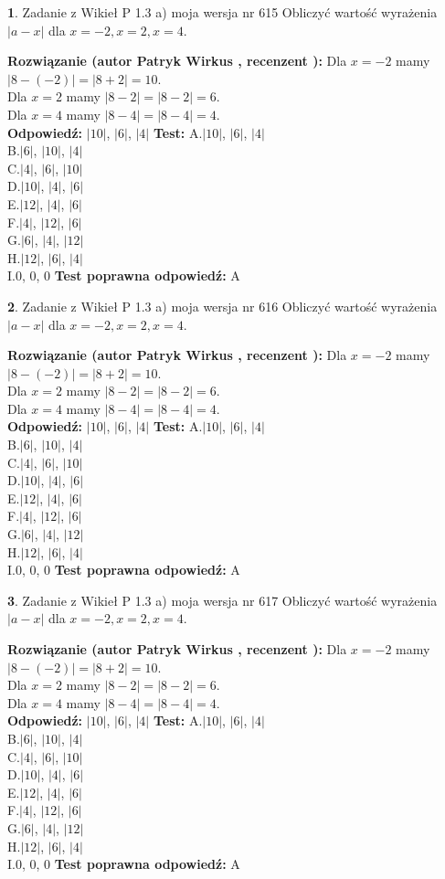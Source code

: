 \documentclass[12pt, a4paper]{article}
\theoremstyle{definition} %
\newtheorem{zad}{}
\newcommand{\zadStart}[1]{\begin{zad}#1\newline}
\newcommand{\zadStop}{\end{zad}}
\newcommand{\rozwStart}[2]{\noindent \textbf{Rozwiązanie (autor #1 , recenzent #2): }\newline}
\newcommand{\rozwStop}{\newline}
\newcommand{\odpStart}{\noindent \textbf{Odpowiedź:}\newline}
\newcommand{\odpStop}{\newline}
\newcommand{\testStart}{\noindent \textbf{Test:}\newline}
\newcommand{\testStop}{\newline}
\newcommand{\kluczStart}{\noindent \textbf{Test poprawna odpowiedź:}\newline}
\newcommand{\kluczStop}{\newline}
\begin{document}
\zadStart{Zadanie z Wikieł P 1.3 a) moja wersja nr 615}
Obliczyć wartość wyrażenia $|a - x|$ dla $x=-2,x=2,x=4$.
\zadStop
\rozwStart{Patryk Wirkus}{}
Dla $x = -2$ mamy $|8 - (-2)| = |8 + 2| = 10$.\\
Dla $x = 2$ mamy $|8 - 2| = |8 - 2| = 6$.\\
Dla $x = 4$ mamy $|8 - 4| = |8 - 4| = 4$.\\
\rozwStop
\odpStart
$|10|$, $|6|$, $|4|$
\odpStop
\testStart
A.$|10|$, $|6|$, $|4|$\\
B.$|6|$, $|10|$, $|4|$\\
C.$|4|$, $|6|$, $|10|$\\
D.$|10|$, $|4|$, $|6|$\\
E.$|12|$, $|4|$, $|6|$\\
F.$|4|$, $|12|$, $|6|$\\
G.$|6|$, $|4|$, $|12|$\\
H.$|12|$, $|6|$, $|4|$\\
I.$0$, $0$, $0$
\testStop
\kluczStart
A
\kluczStop



\zadStart{Zadanie z Wikieł P 1.3 a) moja wersja nr 616}
Obliczyć wartość wyrażenia $|a - x|$ dla $x=-2,x=2,x=4$.
\zadStop
\rozwStart{Patryk Wirkus}{}
Dla $x = -2$ mamy $|8 - (-2)| = |8 + 2| = 10$.\\
Dla $x = 2$ mamy $|8 - 2| = |8 - 2| = 6$.\\
Dla $x = 4$ mamy $|8 - 4| = |8 - 4| = 4$.\\
\rozwStop
\odpStart
$|10|$, $|6|$, $|4|$
\odpStop
\testStart
A.$|10|$, $|6|$, $|4|$\\
B.$|6|$, $|10|$, $|4|$\\
C.$|4|$, $|6|$, $|10|$\\
D.$|10|$, $|4|$, $|6|$\\
E.$|12|$, $|4|$, $|6|$\\
F.$|4|$, $|12|$, $|6|$\\
G.$|6|$, $|4|$, $|12|$\\
H.$|12|$, $|6|$, $|4|$\\
I.$0$, $0$, $0$
\testStop
\kluczStart
A
\kluczStop



\zadStart{Zadanie z Wikieł P 1.3 a) moja wersja nr 617}
Obliczyć wartość wyrażenia $|a - x|$ dla $x=-2,x=2,x=4$.
\zadStop
\rozwStart{Patryk Wirkus}{}
Dla $x = -2$ mamy $|8 - (-2)| = |8 + 2| = 10$.\\
Dla $x = 2$ mamy $|8 - 2| = |8 - 2| = 6$.\\
Dla $x = 4$ mamy $|8 - 4| = |8 - 4| = 4$.\\
\rozwStop
\odpStart
$|10|$, $|6|$, $|4|$
\odpStop
\testStart
A.$|10|$, $|6|$, $|4|$\\
B.$|6|$, $|10|$, $|4|$\\
C.$|4|$, $|6|$, $|10|$\\
D.$|10|$, $|4|$, $|6|$\\
E.$|12|$, $|4|$, $|6|$\\
F.$|4|$, $|12|$, $|6|$\\
G.$|6|$, $|4|$, $|12|$\\
H.$|12|$, $|6|$, $|4|$\\
I.$0$, $0$, $0$
\testStop
\kluczStart
A
\kluczStop
\end{document}
